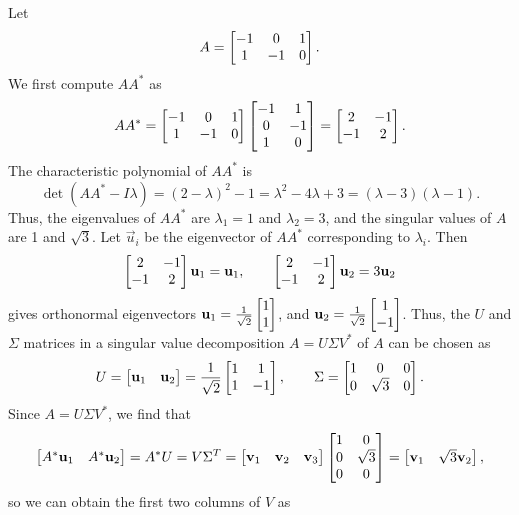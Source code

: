 \documentclass{homework}
\begin{document}
	\question 
	\begin{alphaparts}
		\questionpart Let
		\begin{equation*}
			A = \left[\begin{matrix}-1 & 0 & 1 \\ 1 & -1 & 0\end{matrix}\right].
		\end{equation*}
		We first compute $AA^*$ as
		\begin{equation*}
			AA^* = \left[\begin{matrix}-1 & 0 & 1 \\ 1 & -1 & 0\end{matrix}\right]\left[\begin{matrix}-1 & 1 \\ 0 & -1 \\ 1 & 0\end{matrix}\right] = \left[\begin{matrix}2 & -1 \\ -1 & 2\end{matrix}\right].
		\end{equation*}
		The characteristic polynomial of $AA^*$ is
		\begin{equation*}
			\det(AA^*-I\lambda) = (2-\lambda)^2 -1 = \lambda^2 - 4\lambda +3 = (\lambda-3)(\lambda-1).
		\end{equation*}
		Thus, the eigenvalues of $AA^*$ are $\lambda_1 = 1$ and $\lambda_2=3$, and the singular values of $A$ are 1 and $\sqrt{3}$. Let $\vec{u}_i$ be the eigenvector of $AA^*$ corresponding to $\lambda_i$. Then
		\begin{equation*}
			\left[\begin{matrix}2&-1\\-1&2\end{matrix}\right]\mathbf{u}_1 = \mathbf{u}_1, \qquad \left[\begin{matrix}2&-1\\-1&2\end{matrix}\right]\mathbf{u}_2 = 3\mathbf{u}_2
		\end{equation*}
		gives orthonormal eigenvectors $\mathbf{u}_1 = \frac{1}{\sqrt{2}}\left[\begin{matrix}1\\1\end{matrix}\right]$, and $\mathbf{u}_2 = \frac{1}{\sqrt{2}}\left[\begin{matrix}1\\-1\end{matrix}\right]$. Thus, the $U$ and $\Sigma$ matrices in a singular value decomposition $A = U\Sigma V^*$ of $A$ can be chosen as
		\begin{equation*}
			U = \left[\begin{matrix}\mathbf{u}_1 & \mathbf{u}_2\end{matrix}\right] = \frac{1}{\sqrt{2}}\left[\begin{matrix}1 & 1 \\1 &-1\end{matrix}\right], \qquad \Sigma = \left[\begin{matrix}1 & 0 & 0 \\ 0 & \sqrt{3} & 0\end{matrix}\right].
		\end{equation*}
		Since $A = U\Sigma V^*$, we find that
		\begin{equation*}
			\left[\begin{matrix}A^*\mathbf{u}_1 & A^*\mathbf{u}_2\end{matrix}\right] = A^*U = V\Sigma^T = \left[\begin{matrix}\mathbf{v}_1 & \mathbf{v}_2 & \mathbf{v}_3\end{matrix}\right]\left[\begin{matrix}1 & 0 \\ 0 & \sqrt{3} \\ 0 & 0\end{matrix}\right] = \left[\begin{matrix}\mathbf{v}_1 & \sqrt{3}\mathbf{v}_2\end{matrix}\right],
		\end{equation*}
		so we can obtain the first two columns of $V$ as
		\begin{equation*}

\end{equation*}
\end{alphaparts}
\end{document}
